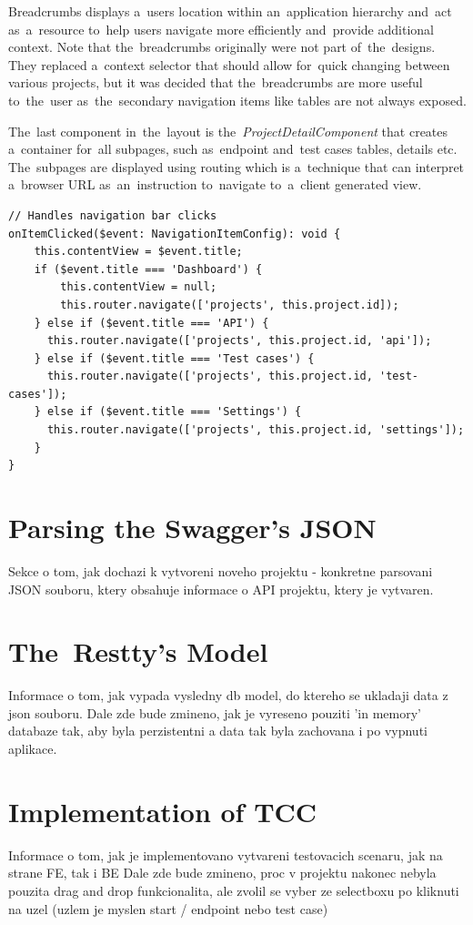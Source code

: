 Breadcrumbs displays a~users location within an~application hierarchy and~act as~a~resource to~help users navigate more
efficiently and~provide additional context. Note that the~breadcrumbs originally were not part of~the~designs. They
replaced a~context selector that should allow for~quick changing between various projects, but it was decided that
the~breadcrumbs are more useful to~the~user as~the~secondary navigation items like tables are not always exposed.

The~last component in~the~layout is the~\textit{ProjectDetailComponent} that creates a~container for~all subpages,
such as~endpoint and~test cases tables, details etc. The~subpages are displayed using routing which is a~technique
that can interpret a~browser URL as~an~instruction to~navigate to~a~client generated view.

\begin{lstlisting}[caption=Solution of~routing the~subpages in~the~\textit{ProjectDetailComponent}.,
style=dp-default]
// Handles navigation bar clicks
onItemClicked($event: NavigationItemConfig): void {
	this.contentView = $event.title;
	if ($event.title === 'Dashboard') {
		this.contentView = null;
		this.router.navigate(['projects', this.project.id]);
    } else if ($event.title === 'API') {
      this.router.navigate(['projects', this.project.id, 'api']);
    } else if ($event.title === 'Test cases') {
      this.router.navigate(['projects', this.project.id, 'test-cases']);
    } else if ($event.title === 'Settings') {
      this.router.navigate(['projects', this.project.id, 'settings']);
    }
}
\end{lstlisting}

\section{Parsing the Swagger's JSON}
Sekce o tom, jak dochazi k vytvoreni noveho projektu - konkretne parsovani JSON souboru,
ktery obsahuje informace o API projektu, ktery je vytvaren.

\section{The~Restty's Model}
Informace o tom, jak vypada vysledny db model, do ktereho se ukladaji data z json souboru.
Dale zde bude zmineno, jak je vyreseno pouziti 'in memory' databaze tak, aby byla perzistentni
a data tak byla zachovana i po vypnuti aplikace.

\section{Implementation of TCC}
Informace o tom, jak je implementovano vytvareni testovacich scenaru, jak na strane FE, tak i BE
Dale zde bude zmineno, proc v projektu nakonec nebyla pouzita drag and drop funkcionalita, ale zvolil se vyber ze 
selectboxu po kliknuti na uzel (uzlem je myslen start / endpoint nebo test case)

